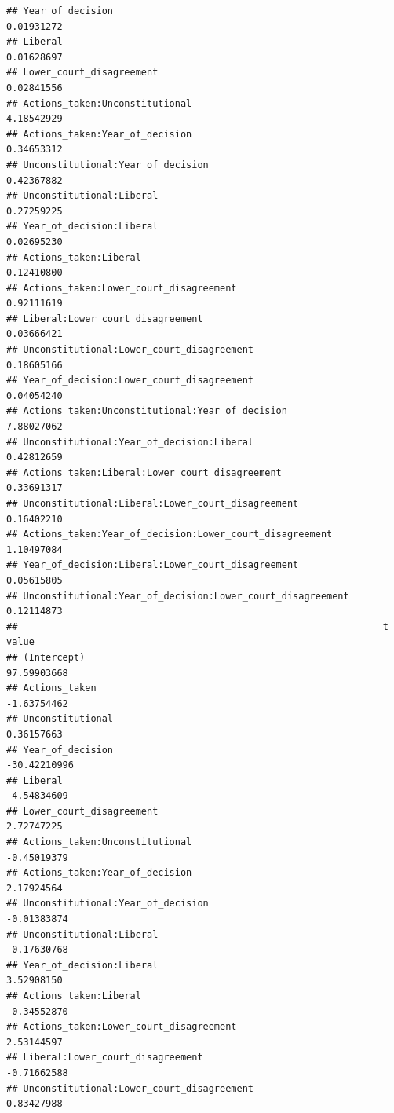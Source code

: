 \documentclass[
]{article}
\begin{document}
\begin{verbatim}
## Year_of_decision                                           0.01931272
## Liberal                                                    0.01628697
## Lower_court_disagreement                                   0.02841556
## Actions_taken:Unconstitutional                             4.18542929
## Actions_taken:Year_of_decision                             0.34653312
## Unconstitutional:Year_of_decision                          0.42367882
## Unconstitutional:Liberal                                   0.27259225
## Year_of_decision:Liberal                                   0.02695230
## Actions_taken:Liberal                                      0.12410800
## Actions_taken:Lower_court_disagreement                     0.92111619
## Liberal:Lower_court_disagreement                           0.03666421
## Unconstitutional:Lower_court_disagreement                  0.18605166
## Year_of_decision:Lower_court_disagreement                  0.04054240
## Actions_taken:Unconstitutional:Year_of_decision            7.88027062
## Unconstitutional:Year_of_decision:Liberal                  0.42812659
## Actions_taken:Liberal:Lower_court_disagreement             0.33691317
## Unconstitutional:Liberal:Lower_court_disagreement          0.16402210
## Actions_taken:Year_of_decision:Lower_court_disagreement    1.10497084
## Year_of_decision:Liberal:Lower_court_disagreement          0.05615805
## Unconstitutional:Year_of_decision:Lower_court_disagreement 0.12114873
##                                                                 t value
## (Intercept)                                                 97.59903668
## Actions_taken                                               -1.63754462
## Unconstitutional                                             0.36157663
## Year_of_decision                                           -30.42210996
## Liberal                                                     -4.54834609
## Lower_court_disagreement                                     2.72747225
## Actions_taken:Unconstitutional                              -0.45019379
## Actions_taken:Year_of_decision                               2.17924564
## Unconstitutional:Year_of_decision                           -0.01383874
## Unconstitutional:Liberal                                    -0.17630768
## Year_of_decision:Liberal                                     3.52908150
## Actions_taken:Liberal                                       -0.34552870
## Actions_taken:Lower_court_disagreement                       2.53144597
## Liberal:Lower_court_disagreement                            -0.71662588
## Unconstitutional:Lower_court_disagreement                    0.83427988

\end{verbatim}
\end{document}
